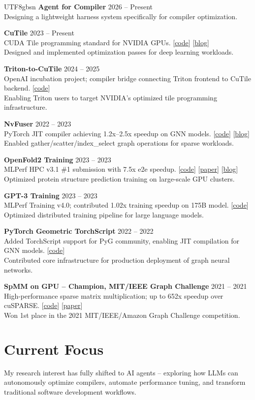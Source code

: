 \documentclass[11pt,a4paper]{article}
\newcommand{\projectentry}[5]{%
    \noindent\textbf{#1} \hfill #2 \\[2pt]
    #4 \hfill {\small #3} \\[1pt]
    #5\par\vspace{8pt}%
}
\newcommand{\projectentrysingle}[3]{%
    \noindent\textbf{#1} \hfill #2 \\[2pt]
    #3\par\vspace{8pt}%
}
\begin{document}
\begin{CJK}{UTF8}{gbsn}
\projectentrysingle{Agent for Compiler}{2026 -- Present}
{Designing a lightweight harness system specifically for compiler optimization.}

\projectentry{CuTile}{2023 -- Present}{[\href{https://github.com/NVIDIA/cutile-python}{code}] [\href{https://developer.nvidia.com/blog/tag/cutile/}{blog}]}
{CUDA Tile programming standard for NVIDIA GPUs.}
{Designed and implemented optimization passes for deep learning workloads.}

\projectentry{Triton-to-CuTile}{2024 -- 2025}{[\href{https://github.com/triton-lang/Triton-to-tile-IR}{code}]}
{OpenAI incubation project; compiler bridge connecting Triton frontend to CuTile backend.}
{Enabling Triton users to target NVIDIA's optimized tile programming infrastructure.}

\projectentry{NvFuser}{2022 -- 2023}{[\href{https://github.com/csarofeen/pytorch/commits/devel/?author=ftxj}{code}] [\href{https://pytorch.org/blog/introducing-nvfuser-a-deep-learning-compiler-for-pytorch/}{blog}]}
{PyTorch JIT compiler achieving 1.2x--2.5x speedup on GNN models.}
{Enabled gather/scatter/index\_select graph operations for sparse workloads.}

\projectentry{OpenFold2 Training}{2023 -- 2023}{[\href{https://github.com/mlcommons/hpc_results_v3.0/tree/main/NVIDIA/benchmarks/openfold}{code}] [\href{https://arxiv.org/abs/2404.11068}{paper}] [\href{https://developer.nvidia.com/blog/optimizing-openfold-training-for-drug-discovery/}{blog}]}
{MLPerf HPC v3.1 \#1 submission with 7.5x e2e speedup.}
{Optimized protein structure prediction training on large-scale GPU clusters.}

\projectentry{GPT-3 Training}{2023 -- 2023}{[\href{https://github.com/NVIDIA/Megatron-LM}{code}]}
{MLPerf Training v4.0; contributed 1.02x training speedup on 175B model.}
{Optimized distributed training pipeline for large language models.}

\projectentry{PyTorch Geometric TorchScript}{2022 -- 2022}{[\href{https://github.com/pyg-team/pytorch_geometric/commits/master/?author=ftxj}{code}]}
{Added TorchScript support for PyG community, enabling JIT compilation for GNN models.}
{Contributed core infrastructure for production deployment of graph neural networks.}

\projectentry{SpMM on GPU -- Champion, MIT/IEEE Graph Challenge}{2021 -- 2021}{[\href{https://github.com/CGCL-codes/Graphchallenge21}{code}] [\href{https://ieeexplore.ieee.org/document/9622791}{paper}]}
{High-performance sparse matrix multiplication; up to 652x speedup over cuSPARSE.}
{Won 1st place in the 2021 MIT/IEEE/Amazon Graph Challenge competition.}

\vspace{4pt}

\section{Current Focus}

\noindent My research interest has fully shifted to AI agents -- exploring how LLMs can autonomously optimize compilers, automate performance tuning, and transform traditional software development workflows.

\end{CJK}
\end{document}
